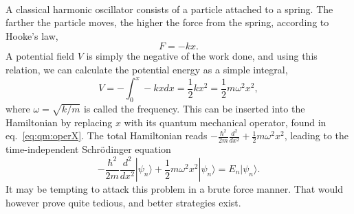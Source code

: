 \paragraph*{}
A classical harmonic oscillator consists of a particle attached to a spring.
The farther the particle moves, the higher the force from the spring, according
to Hooke's law,
\begin{equation}
F = -kx .
\end{equation}
A potential field $V$ is simply the negative of the work done, and using this relation, we can calculate the potential energy as a simple integral,
\begin{equation}
V = - \int_0^x -kx dx = \frac{1}{2} kx^2 = \frac{1}{2} m \omega^2 x^2,
\end{equation}
where $\omega = \sqrt{k/m}$ is called the frequency.
This can be inserted into the Hamiltonian by replacing $x$ with its quantum
mechanical operator, found in eq.~\eqref{eq:qm:operX}. The total Hamiltonian reads 
$-\frac{\hbar^2}{2m}\frac{d^2}{dx^2} + \frac{1}{2} m \omega^2 x^2$, leading to
the time-independent Schrödinger equation
\begin{equation}
-\frac{\hbar^2}{2m}\frac{d^2}{dx^2}|\psi_n\rangle + \frac{1}{2} m \omega^2 x^2|\psi_n\rangle 
= E_n|\psi_n\rangle .
\end{equation}
It may be tempting to attack this problem in a brute force manner.
That would however prove quite tedious, and better strategies exist.


